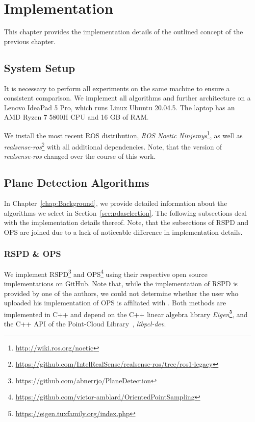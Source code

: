 \documentclass[main.tex]{subfiles}
\begin{document}
\chapter{Implementation}
This chapter provides the implementation details of the outlined concept of the previous chapter.
\section{System Setup}
It is necessary to perform all experiments on the same machine to ensure a consistent comparison.
We implement all algorithms and further architecture on a Lenovo IdeaPad 5 Pro,
which runs Linux Ubuntu 20.04.5. The laptop has an AMD Ryzen 7 5800H CPU and 16 GB of RAM.

We install the most recent ROS distribution, \textit{ROS Noetic Ninjemys}\footnote{\href{http://wiki.ros.org/noetic}{http://wiki.ros.org/noetic}}, as well as 
\textit{realsense-ros}\footnote{\href{https://github.com/IntelRealSense/realsense-ros/tree/ros1-legacy}{https://github.com/IntelRealSense/realsense-ros/tree/ros1-legacy}} with all additional dependencies.
Note, that the version of \textit{realsense-ros} changed over the course of this work. 
 
\section{Plane Detection Algorithms}
In Chapter~\ref{chap:Background}, we provide detailed information about the algorithms we select in Section~\ref{sec:pdaselection}.
The following subsections deal with the implementation details thereof. 
Note, that the subsections of RSPD and OPS are joined due to a lack of noticeable difference in implementation details.

\subsection{RSPD \& OPS}
We implement RSPD\footnote{\href{https://github.com/abnerrjo/PlaneDetection}{https://github.com/abnerrjo/PlaneDetection}} and OPS\footnote{\href{https://github.com/victor-amblard/OrientedPointSampling}{https://github.com/victor-amblard/OrientedPointSampling}} using their respective open source implementations on GitHub.
Note that, while the implementation of RSPD is provided by one of the authors, we could not determine whether the user who uploaded his implementation of OPS is affiliated with \citeauthor{Sun_Mordohai_2019}\cite{Sun_Mordohai_2019}.
Both methods are implemented in C++ and depend on the C++ linear algebra library \textit{Eigen}\footnote{\href{https://eigen.tuxfamily.org/index.php}{https://eigen.tuxfamily.org/index.php}},
and the C++ API of the Point-Cloud Library~\cite{Rusu_ICRA2011_PCL}, \textit{libpcl-dev}.
\end{document}
